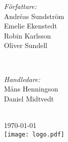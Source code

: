 \begin{titlepage}
\begin{minipage}{0.4\textwidth}
\begin{flushleft} \large
\emph{Författare:}\\
Andréas Sundström\footnotemark{} \\
Emelie Ekenstedt\footnotemark{} \\
Robin Karlsson\footnotemark{} \\
Oliver Sundell\footnotemark{}
\end{flushleft}
\end{minipage}
~
\begin{minipage}{0.4\textwidth}
\begin{flushright} \large
\emph{Handledare:} \\
Måns Henningson\\
Daniel Midtvedt\\
\end{flushright}
\end{minipage}\\[3cm]




{\large \today}\\[1cm] %


\texttt{[image: logo.pdf]} %
 

\vfill %

\end{titlepage}
\restoregeometry



\clearpage
{}
\setcounter{page}{2}%
\thispagestyle{plain}

